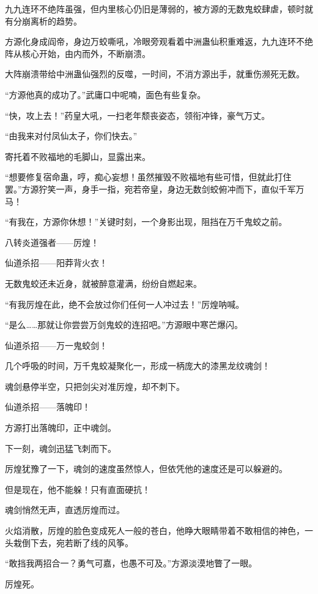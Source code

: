 \begin{this_body}
九九连环不绝阵虽强，但内里核心仍旧是薄弱的，被方源的无数鬼蛟肆虐，顿时就有分崩离析的趋势。

方源化身成阎帝，身边万蛟嘶吼，冷眼旁观看着中洲蛊仙积重难返，九九连环不绝阵从核心开始，由内而外，不断崩溃。

大阵崩溃带给中洲蛊仙强烈的反噬，一时间，不消方源出手，就重伤濒死无数。

“方源他真的成功了。”武庸口中呢喃，面色有些复杂。

“快，攻上去！”药皇大吼，一扫老年颓丧姿态，领衔冲锋，豪气万丈。

“由我来对付凤仙太子，你们快去。”

寄托着不败福地的毛脚山，显露出来。

“想要修复宿命蛊，哼，痴心妄想！虽然摧毁不败福地有些可惜，但就此打住罢。”方源狞笑一声，身手一指，宛若帝皇，身边无数剑蛟俯冲而下，直似千军万马！

“有我在，方源你休想！”关键时刻，一个身影出现，阻挡在万千鬼蛟之前。

八转炎道强者——厉煌！

仙道杀招——阳莽背火衣！

无数鬼蛟还未近身，就被醉意灌满，纷纷自燃起来。

“有我厉煌在此，绝不会放过你们任何一人冲过去！”厉煌呐喊。

“是么……那就让你尝尝万剑鬼蛟的连招吧。”方源眼中寒芒爆闪。

仙道杀招——万一鬼蛟剑！

几个呼吸的时间，万千鬼蛟凝聚化一，形成一柄庞大的漆黑龙纹魂剑！

魂剑悬停半空，只把剑尖对准厉煌，却不刺下。

仙道杀招——落魄印！

方源打出落魄印，正中魂剑。

下一刻，魂剑迅猛飞刺而下。

厉煌犹豫了一下，魂剑的速度虽然惊人，但依凭他的速度还是可以躲避的。

但是现在，他不能躲！只有直面硬抗！

魂剑悄然无声，直透厉煌而过。

火焰消散，厉煌的脸色变成死人一般的苍白，他睁大眼睛带着不敢相信的神色，一头栽倒下去，宛若断了线的风筝。

“敢挡我两招合一？勇气可嘉，也愚不可及。”方源淡漠地瞥了一眼。

厉煌死。

\end{this_body}

